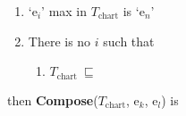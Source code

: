 \begin{ex}
\begin{enumerate}
\begin{enumerate}
 
\end{enumerate} 
   
 
\item `e$_i$' max in $T_{\mathrm{chart}}$ is `e$_n$'

\item There is no $i$ such that

\begin{enumerate}
\item []$T_{\mathrm{chart}}\ \sqsubseteq$ 
\end{enumerate}
 
\end{enumerate}

then \textbf{Compose}($T_{\mathrm{chart}}$, e$_k$, e$_l$) is


\end{ex}
